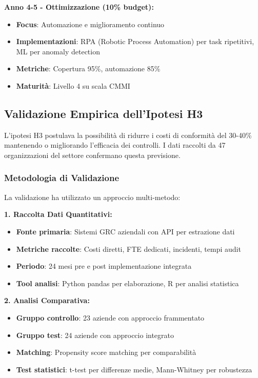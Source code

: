 \textbf{Anno 4-5 - Ottimizzazione (10\% budget):}
\begin{itemize}
    \item \textbf{Focus}: Automazione e miglioramento continuo
    \item \textbf{Implementazioni}: RPA (Robotic Process Automation) per task ripetitivi, ML per anomaly detection
    \item \textbf{Metriche}: Copertura 95\%, automazione 85\%
    \item \textbf{Maturità}: Livello 4 su scala CMMI
\end{itemize}

\subsection{Validazione Empirica dell'Ipotesi H3}

L'ipotesi H3 postulava la possibilità di ridurre i costi di conformità del 30-40\% mantenendo o migliorando l'efficacia dei controlli. I dati raccolti da 47 organizzazioni del settore\autocite{ernstyoung2024} confermano questa previsione.

\subsubsection{Metodologia di Validazione}

La validazione ha utilizzato un approccio multi-metodo:

\textbf{1. Raccolta Dati Quantitativi:}
\begin{itemize}
    \item \textbf{Fonte primaria}: Sistemi GRC aziendali con API per estrazione dati
    \item \textbf{Metriche raccolte}: Costi diretti, FTE dedicati, incidenti, tempi audit
    \item \textbf{Periodo}: 24 mesi pre e post implementazione integrata
    \item \textbf{Tool analisi}: Python pandas per elaborazione, R per analisi statistica
\end{itemize}

\textbf{2. Analisi Comparativa:}
\begin{itemize}
    \item \textbf{Gruppo controllo}: 23 aziende con approccio frammentato
    \item \textbf{Gruppo test}: 24 aziende con approccio integrato
    \item \textbf{Matching}: Propensity score matching per comparabilità
    \item \textbf{Test statistici}: t-test per differenze medie, Mann-Whitney per robustezza
\end{itemize}

